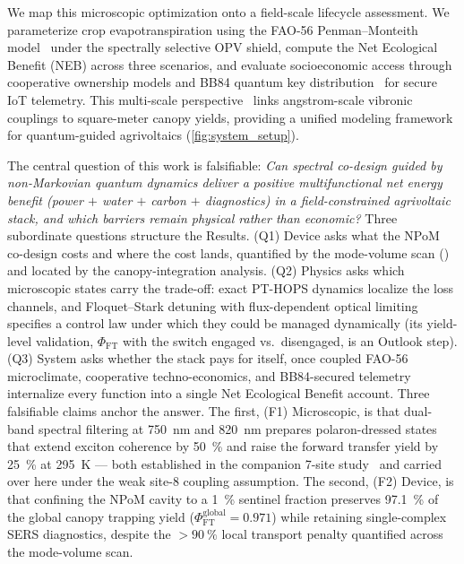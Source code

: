 \documentclass[preprint,12pt]{elsarticle}
\begin{document}
We map this microscopic optimization onto a field-scale lifecycle assessment.
We parameterize crop evapotranspiration using the FAO-56 Penman--Monteith model~\cite{Allen1998} under the spectrally selective OPV shield, compute the Net Ecological Benefit (NEB) across three scenarios, and evaluate socioeconomic access through cooperative ownership models and BB84 quantum key distribution~\cite{Bennett1984} for secure IoT telemetry.
This multi-scale perspective~\cite{Vandamme2025} links angstrom-scale vibronic couplings to square-meter canopy yields, providing a unified modeling framework for quantum-guided agrivoltaics (\cref{fig:system_setup}).

The central question of this work is falsifiable: \emph{Can spectral co-design guided by non-Markovian quantum dynamics deliver a positive multifunctional net energy benefit (power $+$ water $+$ carbon $+$ diagnostics) in a field-constrained agrivoltaic stack, and which barriers remain physical rather than economic?}
Three subordinate questions structure the Results. (Q1) Device asks what the NPoM co-design costs and where the cost lands, quantified by the mode-volume scan () and located by the canopy-integration analysis. (Q2) Physics asks which microscopic states carry the trade-off: exact PT-HOPS dynamics localize the loss channels, and Floquet--Stark detuning with flux-dependent optical limiting specifies a control law under which they could be managed dynamically (its yield-level validation, $\Phi_{\mathrm{FT}}$ with the switch engaged vs.\ disengaged, is an Outlook step). (Q3) System asks whether the stack pays for itself, once coupled FAO-56 microclimate, cooperative techno-economics, and BB84-secured telemetry internalize every function into a single Net Ecological Benefit account.
Three falsifiable claims anchor the answer. The first, (F1) Microscopic, is that dual-band spectral filtering at \qty{750}{\nm} and \qty{820}{\nm} prepares polaron-dressed states that extend exciton coherence by \qty{50}{\percent} and raise the forward transfer yield by \qty{25}{\percent} at \qty{295}{\kelvin} --- both established in the companion 7-site study~\cite{TeguiaKouam2026} and carried over here under the weak site-8 coupling assumption.
The second, (F2) Device, is that confining the NPoM cavity to a \qty{1}{\percent} sentinel fraction preserves \qty{97.1}{\percent} of the global canopy trapping yield ($\Phi_{\mathrm{FT}}^{\mathrm{global}} = 0.971$) while retaining single-complex SERS diagnostics, despite the $>\qty{90}{\percent}$ local transport penalty quantified across the mode-volume scan.
\end{document}
